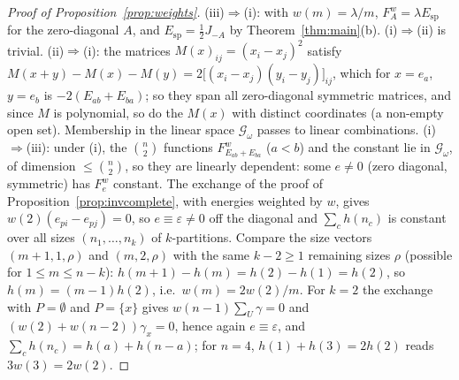 \documentclass[11pt,a4paper]{article}
\theoremstyle{plain}
\theoremstyle{definition}
\theoremstyle{remark}
\newcommand{\spec}{\mathrm{sp}}
\begin{document}
\begin{proof}[Proof of Proposition~\ref{prop:weights}]
(iii)$\Rightarrow$(i): with $w(m)=\lambda/m$, $F^w_A=\lambda E_\spec$ for the zero-diagonal $A$, and $E_\spec=\tfrac12J_{-A}$ by Theorem~\ref{thm:main}(b). (i)$\Rightarrow$(ii) is trivial. (ii)$\Rightarrow$(i): the matrices $M(x)_{ij}=(x_i-x_j)^2$ satisfy $M(x+y)-M(x)-M(y)=2\bigl[(x_i-x_j)(y_i-y_j)\bigr]_{ij}$, which for $x=e_a$, $y=e_b$ is $-2(E_{ab}+E_{ba})$; so they span all zero-diagonal symmetric matrices, and since $M$ is polynomial, so do the $M(x)$ with distinct coordinates (a non-empty open set). Membership in the linear space $\mathcal G_\omega$ passes to linear combinations. (i)$\Rightarrow$(iii): under (i), the $\binom n2$ functions $F^w_{E_{ab}+E_{ba}}$ ($a<b$) and the constant lie in $\mathcal G_\omega$, of dimension $\le\binom n2$, so they are linearly dependent: some $e\ne0$ (zero diagonal, symmetric) has $F^w_e$ constant. The exchange of the proof of Proposition~\ref{prop:invcomplete}, with energies weighted by $w$, gives $w(2)(e_{pi}-e_{pj})=0$, so $e\equiv\varepsilon\ne0$ off the diagonal and $\sum_ch(n_c)$ is constant over all sizes $(n_1,\dots,n_k)$ of $k$-partitions. Compare the size vectors $(m+1,1,\rho)$ and $(m,2,\rho)$ with the same $k-2\ge1$ remaining sizes $\rho$ (possible for $1\le m\le n-k$): $h(m+1)-h(m)=h(2)-h(1)=h(2)$, so $h(m)=(m-1)h(2)$, i.e.\ $w(m)=2w(2)/m$. For $k=2$ the exchange with $P=\emptyset$ and $P=\{x\}$ gives $w(n-1)\sum_{U}\gamma=0$ and $(w(2)+w(n-2))\gamma_x=0$, hence again $e\equiv\varepsilon$, and $\sum_ch(n_c)=h(a)+h(n-a)$; for $n=4$, $h(1)+h(3)=2h(2)$ reads $3w(3)=2w(2)$.
\end{proof}
\end{document}
